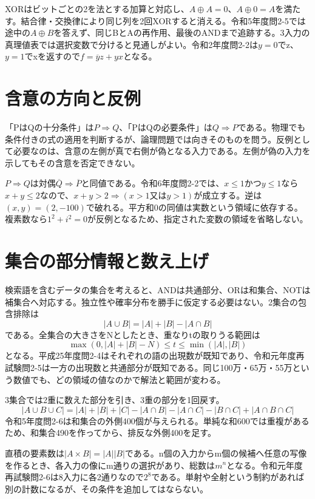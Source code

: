 XORはビットごとの2を法とする加算と対応し、\(A\oplus A=0\)、\(A\oplus0=A\)を満たす。結合律・交換律により同じ列を2回XORすると消える。令和5年度問2-5では途中の\(A\oplus B\)を答えず、同じBとAの再作用、最後のANDまで追跡する。3入力の真理値表では選択変数で分けると見通しがよい。令和2年度問2-2は\(y=0\)でz、\(y=1\)でxを返すので\(f=\overline yz+yx\)となる。

\section{含意の方向と反例}
\label{theory:information:implication}
「PはQの十分条件」は\(P\Rightarrow Q\)、「PはQの必要条件」は\(Q\Rightarrow P\)である。物理でも条件付きの式の適用を判断するが、論理問題では向きそのものを問う。反例として必要なのは、含意の左側が真で右側が偽となる入力である。左側が偽の入力を示してもその含意を否定できない。

\(P\Rightarrow Q\)は対偶\(\overline Q\Rightarrow\overline P\)と同値である。令和6年度問2-2では、\(x\le1\)かつ\(y\le1\)なら\(x+y\le2\)なので、\(x+y>2\Rightarrow(x>1\text{又は}y>1)\)が成立する。逆は\((x,y)=(2,-100)\)で破れる。平方和0の同値は実数という領域に依存する。複素数なら\(1^2+i^2=0\)が反例となるため、指定された変数の領域を省略しない。

\section{集合の部分情報と数え上げ}
\label{theory:information:sets}
検索語を含むデータの集合を考えると、ANDは共通部分、ORは和集合、NOTは補集合へ対応する。独立性や確率分布を勝手に仮定する必要はない。2集合の包含排除は
\[
 |A\cup B|=|A|+|B|-|A\cap B|
\]
である。全集合の大きさをNとしたとき、重なりtの取りうる範囲は
\[
 \max(0,|A|+|B|-N)\le t\le\min(|A|,|B|)
\]
となる。平成25年度問2-4はそれぞれの語の出現数が既知であり、令和元年度再試験問2-5は一方の出現数と共通部分が既知である。同じ100万・65万・55万という数値でも、どの領域の値なのかで解法と範囲が変わる。

3集合では2重に数えた部分を引き、3重の部分を1回戻す。
\[
 |A\cup B\cup C|=|A|+|B|+|C|
 -|A\cap B|-|A\cap C|-|B\cap C|+|A\cap B\cap C|
\]
令和5年度問2-6は和集合の外側400個が与えられる。単純な和600では重複があるため、和集合490を作ってから、排反な外側400を足す。

直積の要素数は\(|A\times B|=|A||B|\)である。n個の入力からm個の候補へ任意の写像を作るとき、各入力の像にm通りの選択があり、総数は\(m^n\)となる。令和元年度再試験問2-6は8入力に各2通りなので\(2^8\)である。単射や全射という制約があれば別の計数になるが、その条件を追加してはならない。

